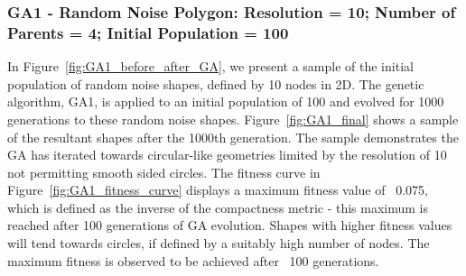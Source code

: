 \documentclass{article}
\begin{document}
\subsubsection*{GA1 - Random Noise Polygon: Resolution = 10; Number of Parents = 4; Initial Population = 100}

In Figure~\ref{fig:GA1_before_after_GA}, we present a sample of the initial population of random noise shapes, defined by 10 nodes in 2D. The genetic algorithm, GA1, is applied to an initial population of 100 and evolved for 1000 generations to these random noise shapes. Figure~\ref{fig:GA1_final} shows a sample of the resultant shapes after the 1000th generation. The sample demonstrates the GA has iterated towards circular-like geometries limited by the resolution of 10 not permitting smooth sided circles. The fitness curve in Figure~\ref{fig:GA1_fitness_curve} displays a maximum fitness value of ~0.075, which is defined as the inverse of the compactness metric - this maximum is reached after 100 generations of GA evolution. Shapes with higher fitness values will tend towards circles, if defined by a suitably high number of nodes. The maximum fitness is observed to be achieved after ~100 generations.
\end{document}
